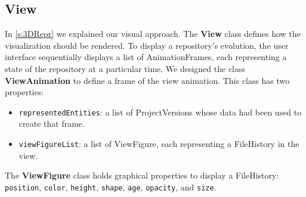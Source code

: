\subsection*{View}
\label{s:view_impl}
In \autoref{s:3DRepr} we explained our visual approach. The \textbf{View} class defines how the visualization should be rendered. 
To display a repository's evolution, the user interface sequentially displays a list of AnimationFrames, each representing a state of the repository at a particular time. We designed the class \textbf{ViewAnimation} to define a frame of the view animation. This class has two properties:
\begin{itemize}
    \item \texttt{representedEntities}: a list of ProjectVersions whose data had been used to create that frame.
    \item \texttt{viewFigureList}: a list of ViewFigure, each representing a FileHistory in the view.
\end{itemize}

The \textbf{ViewFigure} class holds graphical properties to display a FileHistory: \texttt{position}, \texttt{color}, \texttt{height}, \texttt{shape}, \texttt{age}, \texttt{opacity}, and \texttt{size}.

